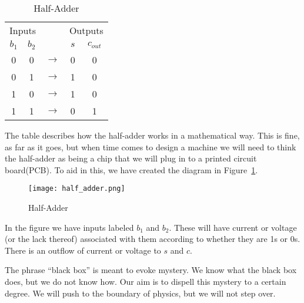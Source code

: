 \begin{table}
			\begin{center}
		\begin{tabular}{ccccc}
			\multicolumn{2}{c}{Inputs}& & \multicolumn{2}{c}{Outputs} \\
			$b_1$ & $b_2$ &             & $s$ & $c_{out}$ \\ \hline 
			0   &   0   & $\rightarrow$ & 0   & 0  \\
			0   &   1   & $\rightarrow$ & 1   & 0  \\			  
			1   &   0   & $\rightarrow$ & 1   & 0  \\			  
			1   &   1   & $\rightarrow$ & 0   & 1  \\			  
		\end{tabular}
	\end{center}
\caption{Half-Adder}\label{table:half-adder}
\end{table}
The table describes how the half-adder works in a mathematical way.  This is fine, as far as it goes, but when time comes to design a machine we will need to think the half-adder as being a chip that we will plug in to a printed circuit board(PCB).  To aid in this, we have created the diagram in Figure~\ref{figure:half-adder}.
\begin{figure}
	\begin{center}
		\texttt{[image: half\_adder.png]}
	\end{center}
	\caption{Half-Adder}\label{figure:half-adder}
\end{figure}
In the figure we have inputs labeled $b_1$ and $b_2$.  These will have current or voltage (or the lack thereof) associated with them according to whether they are 1s or 0s.   There is an outflow of current or voltage to $s$ and $c$.

The phrase ``black box'' is meant to evoke mystery.  We know what the black box does, but we do not know how.  Our aim is to dispell this mystery to a certain degree. We will push to the boundary of physics, but we will not step over.

